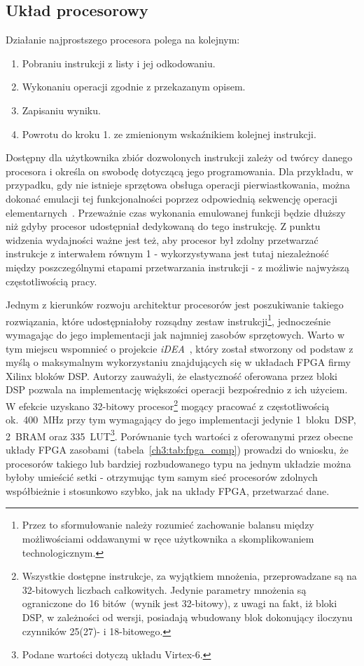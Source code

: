 \subsection{Układ procesorowy}
Działanie najprostszego procesora polega na kolejnym:
\begin{enumerate}
\item Pobraniu instrukcji z listy i jej odkodowaniu.
\item Wykonaniu operacji zgodnie z przekazanym opisem.
\item Zapisaniu wyniku.
\item Powrotu do kroku 1. ze zmienionym wskaźnikiem kolejnej instrukcji.
\end{enumerate}
Dostępny dla użytkownika zbiór dozwolonych instrukcji zależy od twórcy danego procesora i określa on swobodę dotyczącą jego programowania. Dla przykładu, w przypadku, gdy nie istnieje sprzętowa obsługa operacji pierwiastkowania, można dokonać emulacji tej funkcjonalności poprzez odpowiednią sekwencję operacji elementarnych~\cite{FAST_INV_SQRT}. Przeważnie czas wykonania emulowanej funkcji będzie dłuższy niż gdyby procesor udostępniał dedykowaną do tego instrukcję. Z punktu widzenia wydajności ważne jest też, aby procesor był zdolny przetwarzać instrukcje z interwałem równym 1 - wykorzystywana jest tutaj niezależność między poszczególnymi etapami przetwarzania instrukcji - z  możliwie najwyższą częstotliwością pracy. 

Jednym z kierunków rozwoju architektur procesorów jest poszukiwanie takiego rozwiązania, które udostępniałoby rozsądny zestaw instrukcji\footnote{Przez to sformułowanie należy rozumieć zachowanie balansu między możliwościami oddawanymi w ręce użytkownika a skomplikowaniem technologicznym.}, jednocześnie wymagając do jego implementacji jak najmniej zasobów sprzętowych. Warto w tym miejscu wspomnieć o projekcie \textit{iDEA}~\cite{iDEA}, który został stworzony od podstaw z myślą o maksymalnym wykorzystaniu znajdujących się w układach FPGA firmy Xilinx bloków DSP. Autorzy zauważyli, że elastyczność oferowana przez bloki DSP pozwala na implementację większości operacji bezpośrednio z ich użyciem. W efekcie uzyskano 32-bitowy procesor\footnote{Wszystkie dostępne instrukcje, za wyjątkiem mnożenia, przeprowadzane są na 32-bitowych liczbach całkowitych. Jedynie parametry mnożenia są ograniczone do 16 bitów~(wynik jest 32-bitowy), z uwagi na fakt, iż bloki DSP, w zależności od wersji, posiadają wbudowany blok dokonujący iloczynu czynników 25(27)- i 18-bitowego.} mogący pracować z częstotliwością ok.~400~MHz przy tym wymagający do jego implementacji jedynie 1~bloku~DSP, 2~BRAM oraz 335~LUT\footnote{Podane wartości dotyczą układu Virtex-6.}. Porównanie tych wartości z oferowanymi przez obecne układy FPGA zasobami~(tabela~\ref{ch3:tab:fpga_comp})  prowadzi do wniosku, że procesorów takiego lub bardziej rozbudowanego typu na jednym układzie można byłoby umieścić setki - otrzymując tym samym sieć procesorów zdolnych współbieżnie i stosunkowo szybko, jak na układy FPGA, przetwarzać dane. 


